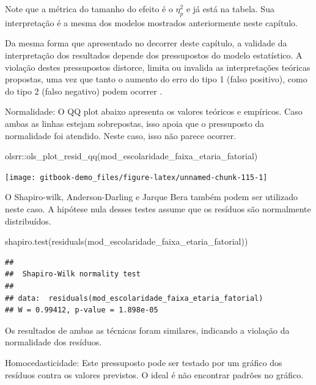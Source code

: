 \documentclass[
]{book}
\newenvironment{Shaded}{\begin{snugshade}}{\end{snugshade}}
\newcommand{\FunctionTok}[1]{\textcolor[rgb]{0.00,0.00,0.00}{#1}}
\newcommand{\NormalTok}[1]{#1}
\newcommand{\SpecialCharTok}[1]{\textcolor[rgb]{0.00,0.00,0.00}{#1}}
\begin{document}
Note que a métrica do tamanho do efeito é o \(\eta_p^2\) e já está na tabela. Sua interpretação é a mesma dos modelos mostrados anteriormente neste capítulo.

Da mesma forma que apresentado no decorrer deste capítulo, a validade da interpretação dos resultados depende dos pressupostos do modelo estatístico. A violação destes pressupostos distorce, limita ou invalida as interpretações teóricas propostas, uma vez que tanto o aumento do erro do tipo 1 (falso positivo), como do tipo 2 (falso negativo) podem ocorrer \citep{Lix1996, Barker2015, Ernst2017}.

Normalidade: O QQ plot abaixo apresenta os valores teóricos e empíricos. Caso ambas as linhas estejam sobrepostas, isso apoia que o pressuposto da normalidade foi atendido. Neste caso, isso não parece ocorrer.

\begin{Shaded}
\begin{Highlighting}[]
\NormalTok{olsrr}\SpecialCharTok{::}\FunctionTok{ols\_plot\_resid\_qq}\NormalTok{(mod\_escolaridade\_faixa\_etaria\_fatorial)}
\end{Highlighting}
\end{Shaded}

\begin{center}\texttt{[image: gitbook-demo\_files/figure-latex/unnamed-chunk-115-1]} \end{center}

O Shapiro-wilk, Anderson-Darling e Jarque Bera também podem ser utilizado neste caso. A hipótese nula desses testes assume que os resíduos são normalmente distribuídos.

\begin{Shaded}
\begin{Highlighting}[]
\FunctionTok{shapiro.test}\NormalTok{(}\FunctionTok{residuals}\NormalTok{(mod\_escolaridade\_faixa\_etaria\_fatorial))}
\end{Highlighting}
\end{Shaded}

\begin{verbatim}
## 
##  Shapiro-Wilk normality test
## 
## data:  residuals(mod_escolaridade_faixa_etaria_fatorial)
## W = 0.99412, p-value = 1.898e-05
\end{verbatim}

Os resultados de ambas as técnicas foram similares, indicando a violação da normalidade dos resíduos.

Homocedasticidade: Este pressuposto pode ser testado por um gráfico dos resíduos contra os valores previstos. O ideal é não encontrar padrões no gráfico.
\end{document}
